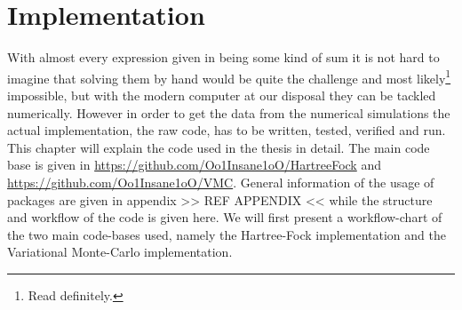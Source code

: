 \chapter{Implementation \label{chapter:5}}
    With almost every expression given in  being some kind of
    sum it is not hard to imagine that solving them by hand would be quite the
    challenge and most likely\footnote{Read definitely.} impossible, but with
    the modern computer at our disposal they can be tackled numerically.
    However in order to get the data from the numerical simulations the actual
    implementation, the raw code, has to be written, tested, verified and run. \\
    This chapter will explain the code used in the thesis in detail. The main
    code base is given in \url{https://github.com/Oo1Insane1oO/HartreeFock} and
    \url{https://github.com/Oo1Insane1oO/VMC}. General information of the usage
    of packages are given in appendix >> REF APPENDIX << while the structure
    and workflow of the code is given here. We will first present a
    workflow-chart of the two main code-bases used, namely the Hartree-Fock
    implementation and the Variational Monte-Carlo implementation.
